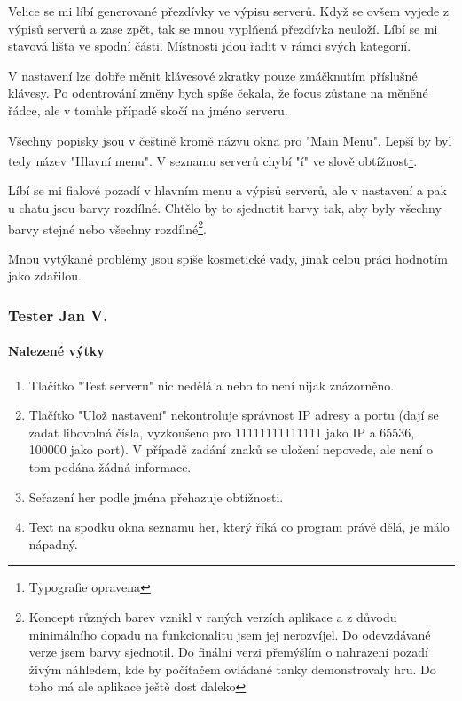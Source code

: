 \documentclass[12pt,a4paper]{article}
\begin{document}
Velice se mi líbí generované přezdívky ve výpisu serverů. Když se ovšem vyjede z výpisů serverů a zase zpět, tak se mnou vyplňená přezdívka neuloží\footnotemark[1]. Líbí se mi stavová lišta ve spodní části. Místnosti jdou řadit v rámci svých kategorií.
%
%

V nastavení lze dobře měnit klávesové zkratky pouze zmáčknutím příslušné klávesy. Po odentrování změny bych spíše čekala, že focus zůstane na měněné řádce, ale v tomhle případě skočí na jméno serveru\footnotemark[2].
%
%

Všechny popisky jsou v češtině kromě názvu okna pro "Main Menu". Lepší by byl tedy název "Hlavní menu". V seznamu serverů chybí "í" ve slově obtížnost\footnote[3]{Typografie opravena}.

Líbí se mi fialové pozadí v hlavním menu a výpisů serverů, ale v nastavení a pak u chatu jsou barvy rozdílné. Chtělo by to sjednotit barvy tak, aby byly všechny barvy stejné nebo všechny rozdílné\footnote[4]{Koncept různých barev vznikl v raných verzích aplikace a z důvodu minimálního dopadu na funkcionalitu jsem jej nerozvíjel. Do odevzdávané verze jsem barvy sjednotil. Do finální verzi přemýšlím o nahrazení pozadí živým náhledem, kde by počítačem ovládané tanky demonstrovaly hru. Do toho má ale aplikace ještě dost daleko}.

Mnou vytýkané problémy jsou spíše kosmetické vady, jinak celou práci hodnotím jako zdařilou.



\newpage
\subsubsection{Tester Jan V.}
\paragraph{Nalezené výtky}
\begin{enumerate}
\item Tlačítko "Test serveru" nic nedělá a nebo to není nijak znázorněno.
\item Tlačítko "Ulož nastavení" nekontroluje správnost IP adresy a portu (dají se zadat libovolná
čísla, vyzkoušeno pro 11111111111111 jako IP a 65536, 100000 jako port). V případě zadání
znaků se uložení nepovede, ale není o tom podána žádná informace.
\item Seřazení her podle jména přehazuje obtížnosti.
\item Text na spodku okna seznamu her, který říká co program právě dělá, je málo nápadný.
\end{enumerate}
\end{document}
